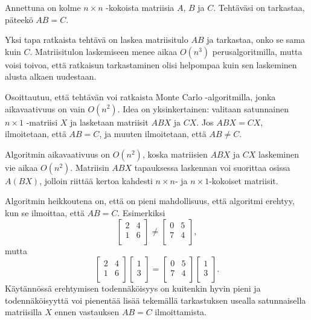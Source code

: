 \begin{task}
Annettuna on kolme $n \times n$ -kokoista matriisia
$A$, $B$ ja $C$.
Tehtäväsi on tarkastaa, päteekö $AB=C$.
\end{task}

Yksi tapa ratkaista tehtävä on laskea matriisitulo
$AB$ ja tarkastaa, onko se sama kuin $C$.
Matriisitulon laskemiseen menee aikaa
$O(n^3)$ perusalgoritmilla, mutta voisi toivoa,
että ratkaisun tarkastaminen olisi helpompaa
kuin sen laskeminen alusta alkaen uudestaan.

Osoittautuu, että tehtävän voi ratkaista
Monte Carlo -algoritmilla,
jonka aikavaativuus on vain $O(n^2)$.
Idea on yksinkertainen: valitaan satunnainen
$n \times 1$ -matriisi $X$ ja lasketaan
matriisit $ABX$ ja $CX$.
Jos $ABX=CX$, ilmoitetaan, että $AB=C$,
ja muuten ilmoitetaan, että $AB \neq C$.

Algoritmin aikavaativuus on $O(n^2)$,
koska matriisien $ABX$ ja $CX$ laskeminen
vie aikaa $O(n^2)$.
Matriisin $ABX$ tapauksessa laskennan
voi suorittaa osissa $A(BX)$, jolloin riittää
kertoa kahdesti $n \times n$- ja $n \times 1$-kokoiset
matriisit.

Algoritmin heikkoutena on, että on pieni mahdollisuus,
että algoritmi erehtyy, kun se ilmoittaa, että $AB=C$.
Esimerkiksi 
\[
 \begin{bmatrix}
  2 & 4 \\
  1 & 6 \\
 \end{bmatrix}
\neq
 \begin{bmatrix}
  0 & 5 \\
  7 & 4 \\
 \end{bmatrix},
\]
mutta
\[
 \begin{bmatrix}
  2 & 4 \\
  1 & 6 \\
 \end{bmatrix}
 \begin{bmatrix}
  1 \\
  3 \\
 \end{bmatrix}
=
 \begin{bmatrix}
  0 & 5 \\
  7 & 4 \\
 \end{bmatrix}
 \begin{bmatrix}
  1 \\
  3 \\
 \end{bmatrix}.
\]
Käytännössä erehtymisen todennäköisyys on kuitenkin hyvin
pieni ja todennäköisyyttä voi pienentää lisää
tekemällä tarkastuksen usealla
satunnaisella matriisilla $X$ ennen vastauksen
$AB=C$ ilmoittamista.

